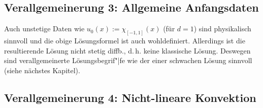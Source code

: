 \subsection{%
    Verallgemeinerung 3: Allgemeine Anfangsdaten%
}

\begin{Bem}
    Auch unstetige Daten wie $u_0(x) := \chi_{[-1,1]}(x)$ (für $d = 1$) sind physikalisch sinnvoll
    und die obige Lösungsformel ist auch wohldefiniert.
    Allerdings ist die resultierende Lösung nicht stetig diffb., d.\,h. keine klassische Lösung.
    Deswegen sind verallgemeinerte Lösungsbegrif"|fe wie der einer schwachen Lösung sinnvoll
    (siehe nächstes Kapitel).
\end{Bem}

\pagebreak

\subsection{%
    Verallgemeinerung 4: Nicht-lineare Konvektion%
}

